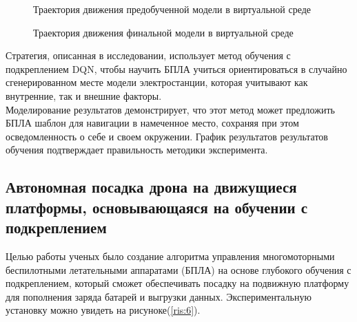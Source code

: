 \documentclass[12 pt, a4paper]{article}
\theoremstyle{definition}
\theoremstyle{plain}
\theoremstyle{remark}
\begin{document}
\begin{figure}[h]
	           \caption{Траектория движения предобученной модели в виртуальной среде}
		
\label{ris:4}
\end{figure}

\begin{figure}[h]
	           \caption{Траектория движения финальной модели в виртуальной среде}
		
\label{ris:5}
\end{figure}


Стратегия, описанная в исследовании, использует метод обучения с подкреплением DQN, чтобы научить БПЛА учиться ориентироваться в случайно сгенерированном месте модели электростанции, которая учитывают как внутренние, так и внешние факторы.\\
Моделирование результатов демонстрирует, что этот метод может предложить БПЛА шаблон для навигации в намеченное место, сохраняя при этом осведомленность о себе и своем окружении. График результатов результатов обучения подтверждает правильность методики эксперимента.\\


\subsection{Автономная посадка дрона на движущиеся платформы, основывающаяся на обучении с подкреплением \cite{litlink3}}
Целью работы ученых было создание алгоритма управления многомоторными беспилотными летательными аппаратами (БПЛА) на основе глубокого обучения с подкреплением, который сможет обеспечивать посадку на подвижную платформу для пополнения заряда батарей и выгрузки данных. Экспериментальную установку можно увидеть на рисуноке(\ref{ris:6}).\\
\end{document}

